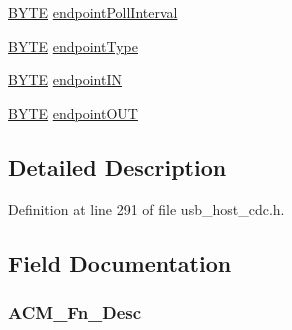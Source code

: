 \begin{DoxyCompactItemize}
\hyperlink{_generic_type_defs_8h_a4ae1dab0fb4b072a66584546209e7d58}{B\+Y\+T\+E} \hyperlink{struct___c_o_m_m___i_n_t_e_r_f_a_c_e___d_e_t_a_i_l_s_ae369dac581a9a365cad424e7c605544c}{endpoint\+Poll\+Interval}
\item 
\hyperlink{_generic_type_defs_8h_a4ae1dab0fb4b072a66584546209e7d58}{B\+Y\+T\+E} \hyperlink{struct___c_o_m_m___i_n_t_e_r_f_a_c_e___d_e_t_a_i_l_s_a60d9b8b97183d8ab3f3076df3bb7ace6}{endpoint\+Type}
\item 
\hyperlink{_generic_type_defs_8h_a4ae1dab0fb4b072a66584546209e7d58}{B\+Y\+T\+E} \hyperlink{struct___c_o_m_m___i_n_t_e_r_f_a_c_e___d_e_t_a_i_l_s_a7315b8753e0b037bc146e042802ebb68}{endpoint\+I\+N}
\item 
\hyperlink{_generic_type_defs_8h_a4ae1dab0fb4b072a66584546209e7d58}{B\+Y\+T\+E} \hyperlink{struct___c_o_m_m___i_n_t_e_r_f_a_c_e___d_e_t_a_i_l_s_af9c36438db4920f863a43c2662548c47}{endpoint\+O\+U\+T}
\end{DoxyCompactItemize}


\subsection{Detailed Description}


Definition at line 291 of file usb\+\_\+host\+\_\+cdc.\+h.



\subsection{Field Documentation}
\hypertarget{struct___c_o_m_m___i_n_t_e_r_f_a_c_e___d_e_t_a_i_l_s_a90d55740b3bc4ec1dddd50ee55becae6}{}
\subsubsection[{A\+C\+M\+\_\+\+Fn\+\_\+\+Desc}]{ A\+C\+M\+\_\+\+Fn\+\_\+\+Desc}\label{struct___c_o_m_m___i_n_t_e_r_f_a_c_e___d_e_t_a_i_l_s_a90d55740b3bc4ec1dddd50ee55becae6}


